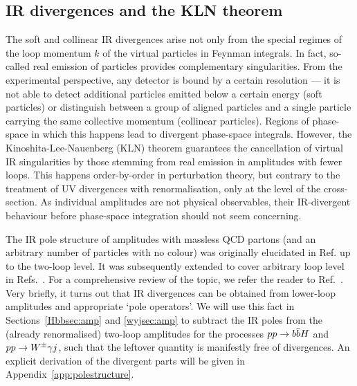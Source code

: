 \documentclass[main.tex]{subfiles}
\begin{document}
\subsection{IR divergences and the KLN theorem} \label{sec:IRdivergencesandKLN}
The soft and collinear IR divergences arise not only from the special regimes of the loop momentum $k$ of the virtual particles in Feynman integrals. In fact, so-called real emission of particles provides complementary singularities. From the experimental perspective, any detector is bound by a certain resolution --- it is not able to detect additional particles emitted below a certain energy (soft particles) or distinguish between a group of aligned particles and a single particle carrying the same collective momentum (collinear particles). Regions of phase-space in which this happens lead to divergent phase-space integrals. However, the Kinoshita-Lee-Nauenberg (KLN) theorem guarantees the cancellation of virtual IR singularities by those stemming from real emission in amplitudes with fewer loops\cite{10.1063/1.1724268, PhysRev.133.B1549}. This happens order-by-order in perturbation theory, but contrary to the treatment of UV divergences with renormalisation, only at the level of the cross-section. As individual amplitudes are not physical observables, their IR-divergent behaviour before phase-space integration should not seem concerning.

The IR pole structure of amplitudes with massless QCD partons (and an arbitrary number of particles with no colour) was originally elucidated in Ref.\cite{Catani:1998bh} up to the two-loop level. It was subsequently extended to cover arbitrary loop level in Refs.~\cite{Becher:2009cu, Becher:2009qa, Gardi:2009qi}. For a comprehensive review of the topic, we refer the reader to Ref.~\cite{Agarwal:2021ais}. Very briefly, it turns out that IR divergences can be obtained from lower-loop amplitudes and appropriate `pole operators'. We will use this fact in Sections~\ref{Hbbsec:amp} and \ref{wyjsec:amp} to subtract the IR poles from the (already renormalised) two-loop amplitudes for the processes $pp \rightarrow b\bar{b}H$ and $pp \rightarrow W^\pm \gamma j$, such that the leftover quantity is manifestly free of divergences. An explicit derivation of the divergent parts will be given in Appendix~\ref{app:polestructure}.
\end{document}
